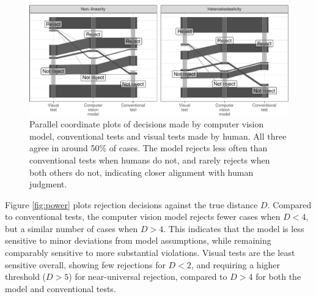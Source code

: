 \documentclass[]{interact}
\theoremstyle{plain}%
\theoremstyle{definition}
\theoremstyle{remark}
\begin{document}
\begin{figure}[!h]

{\centering \includegraphics[width=1\linewidth]{paper_files/figure-latex/pcp-1} 

}

\caption{Parallel coordinate plots of decisions made by computer vision model, conventional tests and visual tests made by human. All three agree in around 50\% of cases. The model rejects less often than conventional tests when humans do not, and rarely rejects when both others do not, indicating closer alignment with human judgment.}\label{fig:pcp}
\end{figure}

Figure \ref{fig:power} plots rejection decisions against the true
distance \(D\). Compared to conventional tests, the computer vision
model rejects fewer cases when \(D < 4\), but a similar number of cases
when \(D > 4\). This indicates that the model is less sensitive to minor
deviations from model assumptions, while remaining comparably sensitive
to more substantial violations. Visual tests are the least sensitive
overall, showing few rejections for \(D < 2\), and requiring a higher
threshold (\(D > 5\)) for near-universal rejection, compared to
\(D > 4\) for both the model and conventional tests.
\end{document}
